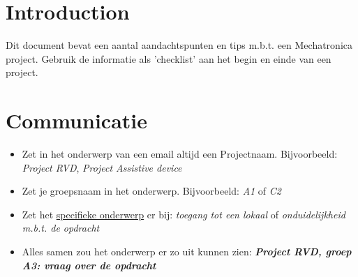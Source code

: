 \documentclass[24pt,a4paper]{article}
\begin{document}
\captionsetup[table]{labelsep=endash}
\captionsetup[figure]{labelsep=endash}

\pagestyle{default}


\section{Introduction}
Dit document bevat een aantal aandachtspunten en tips m.b.t. een Mechatronica project.
Gebruik de informatie als 'checklist' aan het begin en einde van een project.

\newcommand{\mssep}{
      \setlength{\itemsep}{5pt}
      \setlength{\parskip}{0pt}
      \setlength{\parsep}{0pt}
}

\section{Communicatie}
\begin{itemize}
      \mssep
      \item Zet in het onderwerp van een email altijd een Projectnaam. Bijvoorbeeld: \textit{Project RVD}, \textit{Project Assistive device}
      \item Zet je groepsnaam in het onderwerp. Bijvoorbeeld: \textit{A1} of \textit{C2}
      \item Zet het \underline{specifieke onderwerp} er bij: \textit{toegang tot een lokaal} of \textit{onduidelijkheid m.b.t. de opdracht}
      \item Alles samen zou het onderwerp er zo uit kunnen zien: \newline
            \textbf{\textit{Project RVD, groep A3: vraag over de opdracht}
            }\end{itemize}
\end{document}
